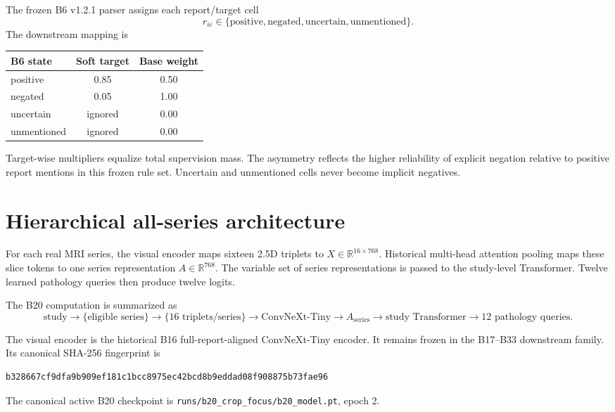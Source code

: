 \documentclass[preprint,12pt]{elsarticle}
\newcommand{\code}[1]{\texttt{#1}}
\newcommand{\R}{\mathbb{R}}
\begin{document}
The frozen B6 v1.2.1 parser assigns each report/target cell
\begin{equation}
r_{ic}\in\{\mathrm{positive},\mathrm{negated},\mathrm{uncertain},\mathrm{unmentioned}\}.
\end{equation}
The downstream mapping is
\begin{center}
\begin{tabular}{lcc}
\toprule
B6 state & Soft target & Base weight \\
\midrule
positive & 0.85 & 0.50 \\
negated & 0.05 & 1.00 \\
uncertain & ignored & 0.00 \\
unmentioned & ignored & 0.00 \\
\bottomrule
\end{tabular}
\end{center}
Target-wise multipliers equalize total supervision mass. The asymmetry reflects the higher reliability of explicit negation relative to positive report mentions in this frozen rule set. Uncertain and unmentioned cells never become implicit negatives.

\section{Hierarchical all-series architecture}
\label{sec:architecture}

For each real MRI series, the visual encoder maps sixteen 2.5D triplets to $X\in\R^{16\times768}$. Historical multi-head attention pooling maps these slice tokens to one series representation $A\in\R^{768}$. The variable set of series representations is passed to the study-level Transformer. Twelve learned pathology queries then produce twelve logits.

The B20 computation is summarized as
\begin{equation}
\text{study}\rightarrow\{\text{eligible series}\}
\rightarrow\{16\text{ triplets/series}\}
\rightarrow\text{ConvNeXt-Tiny}
\rightarrow A_{\mathrm{series}}
\rightarrow\text{study Transformer}
\rightarrow\text{12 pathology queries}.
\end{equation}

The visual encoder is the historical B16 full-report-aligned ConvNeXt-Tiny encoder. It remains frozen in the B17--B33 downstream family. Its canonical SHA-256 fingerprint is
\begin{verbatim}
b328667cf9dfa9b909ef181c1bcc8975ec42bcd8b9eddad08f908875b73fae96
\end{verbatim}
The canonical active B20 checkpoint is \code{runs/b20\_crop\_focus/b20\_model.pt}, epoch 2.
\end{document}
